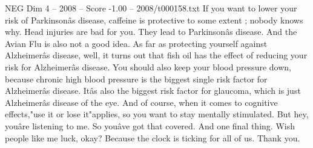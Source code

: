 \begin{textsample}{NEG Dim 4 – 2008 – Score -1.00 – 2008/t000158.txt}
If you want to lower your risk of Parkinsonâs disease, caffeine is protective to some extent ; nobody knows why.
Head injuries are bad for you.
They lead to Parkinsonâs disease.
And the Avian Flu is also not a good idea.
As far as protecting yourself against Alzheimerâs disease, well, it turns out that fish oil has the effect of reducing your risk for Alzheimerâs disease.
You should also keep your blood pressure down, because chronic high blood pressure is the biggest single risk factor for Alzheimerâs disease.
Itâs also the biggest risk factor for glaucoma, which is just Alzheimerâs disease of the eye.
And of course, when it comes to cognitive effects,"use it or lose it"applies, so you want to stay mentally stimulated.
But hey, youâre listening to me.
So youâve got that covered.
And one final thing.
Wish people like me luck, okay?
Because the clock is ticking for all of us.
Thank you.

\end{textsample}
